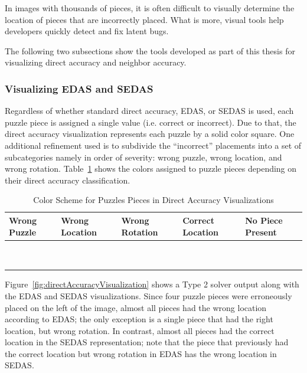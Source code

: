 \documentclass{report}
\begin{document}
In images with thousands of pieces, it is often difficult to visually determine the location of pieces that are incorrectly placed.  What is more, visual tools help developers quickly detect and fix latent bugs.

The following two subsections show the tools developed as part of this thesis for visualizing direct accuracy and neighbor accuracy.

\subsubsection{Visualizing EDAS and SEDAS}\label{sec:visualizingEdasSedas}

Regardless of whether standard direct accuracy, EDAS, or SEDAS is used, each puzzle piece is assigned a single value (i.e. correct or incorrect).  Due to that, the direct accuracy visualization represents each puzzle by a solid color square.  One additional refinement used is to subdivide the ``incorrect'' placements into a set of subcategories namely in order of severity: wrong puzzle, wrong location, and wrong rotation.  Table~\ref{tab:directAccuracyColors} shows the colors assigned to puzzle pieces depending on their direct accuracy classification.

\begin{table}[h]
	\begin{center}
  		\begin{tabular}{ | >{\centering\arraybackslash}m{0.6in} | >{\centering\arraybackslash}m{0.6in} | >{\centering\arraybackslash}m{0.6in} | >{\centering\arraybackslash}m{0.6in} | >{\centering\arraybackslash}m{0.6in} | }
 \hline
    		Wrong Puzzle & Wrong Location & Wrong Rotation & Correct Location  & No Piece Present  \\ \hline
			{\cellcolor{blue}~} & {\cellcolor{red}~}  & {\cellcolor{orange}~}  & {\cellcolor{green}~} & {\cellcolor{black}~}  \\
			{\cellcolor{blue}~} & {\cellcolor{red}~}  & {\cellcolor{orange}~}  & {\cellcolor{green}~} & {\cellcolor{black}~} \\
 \hline
		\end{tabular}
	\end{center}
\caption{Color Scheme for Puzzles Pieces in Direct Accuracy Visualizations}\label{tab:directAccuracyColors}
\end{table}

Figure~\ref{fig:directAccuracyVisualization} shows a Type 2 solver output along with the EDAS and SEDAS visualizations. Since four puzzle pieces were erroneously placed on the left of the image, almost all pieces had the wrong location according to EDAS; the only exception is a single piece that had the right location, but wrong rotation.  In contrast, almost all pieces had the correct location in the SEDAS representation; note that the piece that previously had the correct location but wrong rotation in EDAS has the wrong location in SEDAS.
\end{document}
